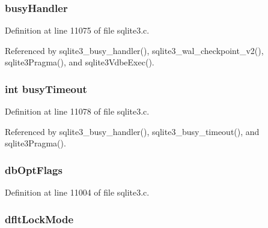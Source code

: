 \subsubsection[{busy\+Handler}]{ busy\+Handler}\label{structsqlite3_ab5dd93304a04c128745b00905dfb8cdc}


Definition at line 11075 of file sqlite3.\+c.



Referenced by sqlite3\+\_\+busy\+\_\+handler(), sqlite3\+\_\+wal\+\_\+checkpoint\+\_\+v2(), sqlite3\+Pragma(), and sqlite3\+Vdbe\+Exec().

\hypertarget{structsqlite3_a2e7c15a3822179952d4a4b8d2c57ee36}{}
\subsubsection[{busy\+Timeout}]{\setlength{\rightskip}{0pt plus 5cm}int busy\+Timeout}\label{structsqlite3_a2e7c15a3822179952d4a4b8d2c57ee36}


Definition at line 11078 of file sqlite3.\+c.



Referenced by sqlite3\+\_\+busy\+\_\+handler(), sqlite3\+\_\+busy\+\_\+timeout(), and sqlite3\+Pragma().

\hypertarget{structsqlite3_a05da10a2569dc432a46dc29bfb527b19}{}
\subsubsection[{db\+Opt\+Flags}]{ db\+Opt\+Flags}\label{structsqlite3_a05da10a2569dc432a46dc29bfb527b19}


Definition at line 11004 of file sqlite3.\+c.

\hypertarget{structsqlite3_ab6d4be4ea22755213051aa6fc53b75d2}{}
\subsubsection[{dflt\+Lock\+Mode}]{ dflt\+Lock\+Mode}\label{structsqlite3_ab6d4be4ea22755213051aa6fc53b75d2}


